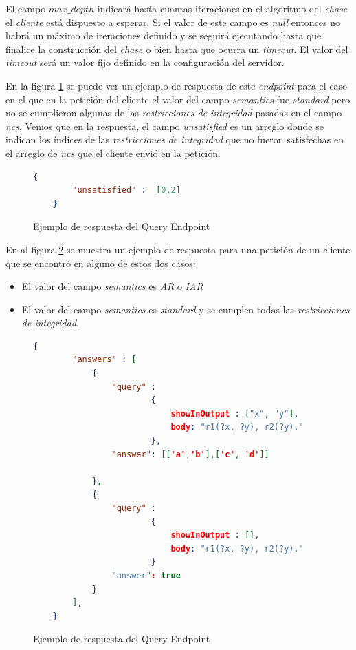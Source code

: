 \documentclass[11pt,a4paper,twoside]{tesis}
\begin{document}
El campo \textit{$max\_depth$} indicará hasta cuantas iteraciones en el algoritmo del \textit{chase} el \textit{cliente} está dispuesto a esperar. Si el valor de este campo es \textit{null} entonces no habrá un máximo de iteraciones definido y se seguirá ejecutando hasta que finalice la construcción del \textit{chase} o bien hasta que ocurra un \textit{timeout}. El valor del \textit{timeout} será un valor fijo definido en la configuración del servidor.

En la figura \ref{fig:query_endpoint_answer_2} se puede ver un ejemplo de respuesta de este \textit{endpoint} para el caso en el que en la petición del cliente el valor del campo \textit{semantics} fue \textit{standard} pero no se cumplieron algunas de las \textit{restricciones de integridad} pasadas en el campo \textit{ncs}. Vemos que en la respuesta, el campo \textit{unsatisfied} es un arreglo donde se indican los índices de las \textit{restricciones de integridad} que no fueron satisfechas en el arreglo de \textit{ncs} que el cliente envió en la petición. 


\begin{figure}[ht]
    \begin{lstlisting}[language=json,firstnumber=1]
    {
    	"unsatisfied" :  [0,2]
    }
    \end{lstlisting}
    \caption{Ejemplo de respuesta del Query Endpoint}
    \label{fig:query_endpoint_answer_2}
\end{figure}


En al figura \ref{fig:query_endpoint_answer_1} se muestra un ejemplo de respuesta para una petición de un cliente que se encontró en alguno de estos dos casos:

\begin{itemize}
    \item El valor del campo \textit{semantics} es \textit{AR} o \textit{IAR}
    \item El valor del campo \textit{semantics} es \textit{standard} y se cumplen todas las \textit{restricciones de integridad}.
\end{itemize}

\begin{figure}[ht]
    \begin{lstlisting}[language=json,firstnumber=1]
    {
    	"answers" : [
            {
                "query" : 
                        {
                            showInOutput : ["x", "y"],
                            body: "r1(?x, ?y), r2(?y)."
                        },
                "answer": [['a','b'],['c', 'd']]
                        
            },
            {
                "query" : 
                        {
                            showInOutput : [],
                            body: "r1(?x, ?y), r2(?y)."
                        }
                "answer": true
            }
    	],
    }
    \end{lstlisting}
    \caption{Ejemplo de respuesta del Query Endpoint}
    \label{fig:query_endpoint_answer_1}
\end{figure}
\end{document}
